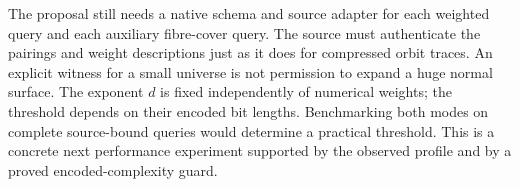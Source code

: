 The proposal still needs a native schema and source adapter for each weighted
query and each auxiliary fibre-cover query. The source must authenticate the
pairings and weight descriptions just as it does for compressed orbit traces.
An explicit witness for a small universe is not permission to expand a huge
normal surface. The exponent $d$ is fixed independently of numerical weights;
the threshold depends on their encoded bit lengths. Benchmarking both modes on complete source-bound
queries would determine a practical threshold. This is a concrete next
performance experiment supported by the observed profile and by a proved
encoded-complexity guard.
